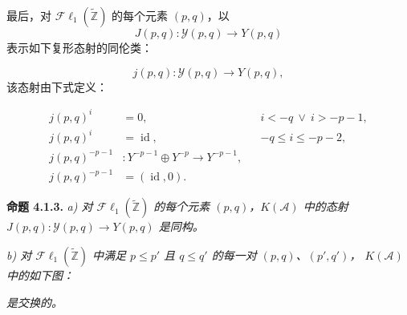 \clearpage
{}%
\begingroup\small\setlength{\parskip}{0pt}\setlength{\emergencystretch}{1.5em}
\setlength{\abovedisplayskip}{4pt plus 2pt minus 2pt}%
\setlength{\belowdisplayskip}{4pt plus 2pt minus 2pt}%

最后，对 $\mathcal{F}\ell_1(\widetilde{\mathbb Z})$ 的每个元素 $(p,q)$，以
\begin{equation}
J(p,q)\colon\mathcal Y(p,q)\longrightarrow Y(p,q)
\tag{4.1.2.9}
\end{equation}
表示如下复形态射的同伦类：

\begin{equation}
j(p,q)\colon\mathcal Y(p,q)\longrightarrow Y(p,q),
\tag{4.1.2.10}
\end{equation}
该态射由下式定义：

\begin{equation}
\begin{aligned}
j(p,q)^i&=0,
  &&i<-q\ \lor\ i>-p-1,\\
j(p,q)^i&=\operatorname{id},
  &&-q\leq i\leq-p-2,\\
j(p,q)^{-p-1}&\colon
  Y^{-p-1}\oplus Y^{-p}\longrightarrow Y^{-p-1},\\
j(p,q)^{-p-1}&=(\operatorname{id},0).
\end{aligned}
\tag{4.1.2.11}
\end{equation}

\medskip\noindent\textbf{命题 4.1.3.}\quad
\textit{a) 对 $\mathcal{F}\ell_1(\widetilde{\mathbb Z})$ 的每个元素
$(p,q)$，$K(\mathcal A)$ 中的态射
$J(p,q)\colon\mathcal Y(p,q)\longrightarrow Y(p,q)$ 是同构。}

\noindent\textit{b) 对 $\mathcal{F}\ell_1(\widetilde{\mathbb Z})$ 中满足
$p\leq p'$ 且 $q\leq q'$ 的每一对 $(p,q)$、$(p',q')$，
$K(\mathcal A)$ 中的如下图：}

\begin{center}
\end{center}
\noindent\textit{是交换的。}

